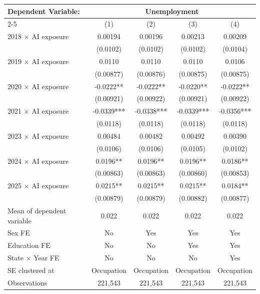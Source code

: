 \def\sym#1{\ifmmode^{#1}\else\(^{#1}\)\fi}
\begin{tabular}{l*{4}{c}}
\toprule
Dependent Variable: & \multicolumn{4}{c}{Unemployment} \\
\cmidrule(lr){2-5}
 & (1) & (2) & (3) & (4) \\
\midrule
2018 $\times$ AI exposure&     0.00194   &     0.00196   &     0.00213   &     0.00209   \\
            &    (0.0102)   &    (0.0102)   &    (0.0102)   &    (0.0104)   \\
2019 $\times$ AI exposure&      0.0110   &      0.0110   &      0.0110   &      0.0106   \\
            &   (0.00877)   &   (0.00876)   &   (0.00875)   &   (0.00875)   \\
2020 $\times$ AI exposure&     -0.0222** &     -0.0222** &     -0.0220** &     -0.0222** \\
            &   (0.00921)   &   (0.00922)   &   (0.00921)   &   (0.00922)   \\
2021 $\times$ AI exposure&     -0.0339***&     -0.0338***&     -0.0339***&     -0.0356***\\
            &    (0.0118)   &    (0.0118)   &    (0.0118)   &    (0.0118)   \\
2023 $\times$ AI exposure&     0.00484   &     0.00482   &     0.00492   &     0.00390   \\
            &    (0.0106)   &    (0.0106)   &    (0.0105)   &    (0.0102)   \\
2024 $\times$ AI exposure&      0.0196** &      0.0196** &      0.0196** &      0.0186** \\
            &   (0.00863)   &   (0.00863)   &   (0.00860)   &   (0.00853)   \\
2025 $\times$ AI exposure&      0.0215** &      0.0215** &      0.0215** &      0.0184** \\
            &   (0.00879)   &   (0.00879)   &   (0.00882)   &   (0.00877)   \\
\midrule
Mean of dependent variable&       0.022   &       0.022   &       0.022   &       0.022   \\
Sex FE      &          No   &         Yes   &         Yes   &         Yes   \\
Education FE&          No   &          No   &         Yes   &         Yes   \\
State $\times$ Year FE&          No   &          No   &          No   &         Yes   \\
SE clustered at&  Occupation   &  Occupation   &  Occupation   &  Occupation   \\
Observations&     221,543   &     221,543   &     221,543   &     221,543   \\
\bottomrule
\end{tabular}
